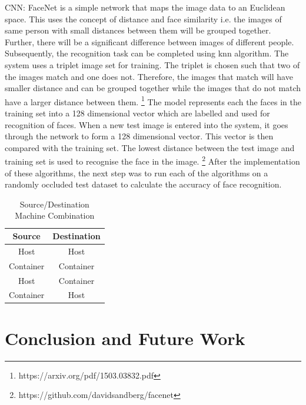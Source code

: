\documentclass[conference]{IEEEtran}
\begin{document}
CNN: FaceNet is a simple network that maps the image data to an Euclidean space. This uses the concept of distance and face similarity i.e. the images of same person with small distances between them will be grouped together. Further, there will be a significant difference between images of different people. Subsequently, the recognition task can be completed using knn algorithm. The system uses a triplet image set for training. The triplet is chosen such that two of the images match and one does not. Therefore, the images that match will have smaller distance and can be grouped together while the images that do not match have a larger distance between them. \footnote{https://arxiv.org/pdf/1503.03832.pdf} The model represents each the faces in the training set into a 128 dimensional vector which are labelled and used for recognition of faces. When a new test image is entered into the system, it goes through the network to form a 128 dimensional vector. This vector is then compared with the training set. The lowest distance between the test image and training set is used to recognise the face in the image. \footnote{https://github.com/davidsandberg/facenet}
After the implementation of these algorithms, the next step was to run each of the algorithms on a randomly occluded test dataset to calculate the accuracy of face recognition. 

\begin{table}[htbp]
\caption{Source/Destination Machine Combination}
\begin{center}
\begin{tabular}{|c|c|}
\hline
\textbf{Source}&\textbf{Destination} \\
\cline{1-2} 
\hline
Host & Host  \\
\hline
Container & Container  \\
\hline
Host & Container \\
\hline
Container & Host \\
\hline
\end{tabular}
\label{table 1}
\end{center}
\end{table}


\section{Conclusion and Future Work}
\label{sec: 4.Conclusion and Future Work}
\end{document}
